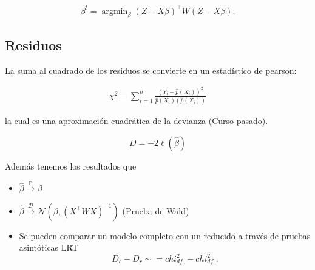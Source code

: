 \documentclass[
  12pt,
]{book}
\providecommand{\tightlist}{%
  \setlength{\itemsep}{0pt}\setlength{\parskip}{0pt}}
\theoremstyle{definition}
\theoremstyle{definition}
\theoremstyle{definition}
\theoremstyle{remark}
\begin{document}
\begin{equation*}
\beta ^{t} = \operatorname{argmin}_{\beta} (Z-X\beta)^{\top}W(Z-X\beta).
\end{equation*}

\hypertarget{residuos}{%
\subsection{Residuos}\label{residuos}}

La suma al cuadrado de los residuos se convierte en un estadístico de pearson:

\begin{align*}
\chi^{2}=\sum_{i=1}^{n} \frac{\left(Y_{i}-\hat{p}(X_{i})\right)^{2}}{\hat{p}(X_{i})(\hat{p}(X_{i}))}
\end{align*}

la cual es una aproximación cuadrática de la devianza (Curso pasado).

\begin{equation*}
D = -2 \ell(\hat{\beta})
\end{equation*}

Además tenemos los resultados que

\begin{itemize}
\tightlist
\item
  \(\hat{\beta} \xrightarrow{\mathbb{P}} \beta\)
\item
  \(\hat{\beta} \xrightarrow{\mathcal{D}} \mathcal{N}\left(\beta,(X^{\top}WX)^{-1}\right)\) (Prueba de Wald)
\item
  Se pueden comparar un modelo completo con un reducido a través de pruebas asintóticas LRT
  \begin{equation*}
  D_c -D_r \sim =chi^{2}_{df_{c}} - chi^{2}_{df_{r}}.
  \end{equation*}
\end{itemize}

\printbibliography
\end{document}
